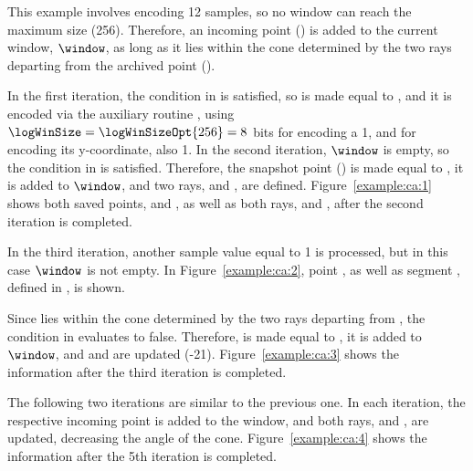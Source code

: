 \exampleIntro{\ref{example:ca:1}}


This example involves encoding 12 samples, so no window can reach the maximum size (256). Therefore, an incoming point (\incoming) is added to the current window, $\window$, as long as it lies within the cone determined by the two rays departing from the archived point (\archived).


In the first iteration, the condition in  is satisfied, so \archived is made equal to , and it is encoded via the auxiliary routine \CAWinStart, using $\logWinSize = \logWinSizeOpt{256}=8$ bits for encoding a 1, and \tobitexp for encoding its y-coordinate, also 1. In the second iteration, $\window$ is empty, so the condition in  is satisfied. Therefore, the snapshot point (\snapshot) is made equal to , it is added to $\window$, and two rays, \smin and \smax, are defined. Figure~\ref{example:ca:1} shows both saved points, \archived and \snapshot, as well as both rays, \smin and \smax, after the second iteration is completed.


\vspace{+3pt}


In the third iteration, another sample value equal to 1 is processed, but in this case $\window$ is not empty. In Figure~\ref{example:ca:2}, point , as well as segment , defined in , is shown.


\vspace{+3pt}


\clearpage


Since  lies within the cone determined by the two rays departing from \archived, the condition in  evaluates to false. Therefore, \snapshot is made equal to , it is added to $\window$, and \smin and \smax are updated (-21). Figure~\ref{example:ca:3} shows the information after the third iteration is completed.


\vspace{+5pt}


The following two iterations are similar to the previous one. In each iteration, the respective incoming point is added to the window, and both rays, \smin and \smax, are updated, decreasing the angle of the cone. Figure~\ref{example:ca:4} shows the information after the 5th iteration is completed.


\vspace{+5pt}


